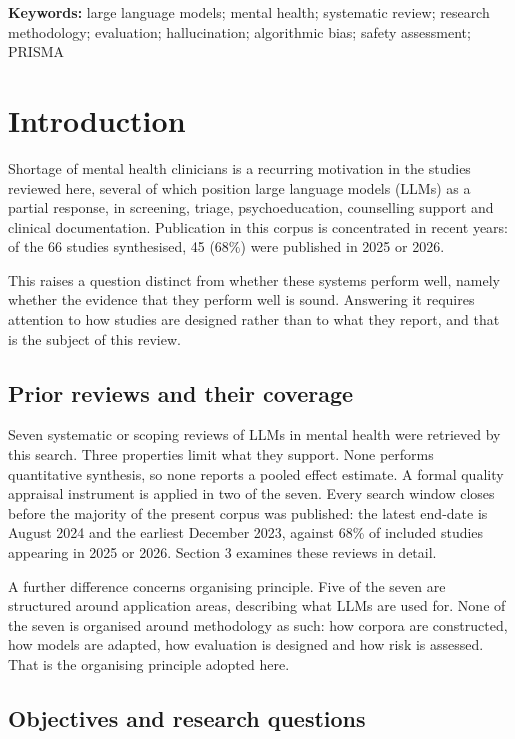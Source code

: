 \documentclass[11pt]{article}
\begin{document}
	\noindent\textbf{Keywords:} large language models; mental health; systematic review; research
	methodology; evaluation; hallucination; algorithmic bias; safety assessment; PRISMA
	
	\section{Introduction}
	
	Shortage of mental health clinicians is a recurring motivation in the studies reviewed here, several
	of which position large language models (LLMs) as a partial response, in screening, triage,
	psychoeducation, counselling support and clinical documentation. Publication in this corpus is
	concentrated in recent years: of the 66 studies synthesised, 45 (68\%) were published in 2025 or
	2026.
	
	This raises a question distinct from whether these systems perform well, namely
	whether the evidence that they perform well is sound. Answering it requires attention to how studies
	are designed rather than to what they report, and that is the subject of this review.
	
	\subsection{Prior reviews and their coverage}
	
	Seven systematic or scoping reviews of LLMs in mental health were retrieved by this
	search\cite{Jin2025LLMMentalHealth,Hua2025LLMMentalHealthScoping,fpsyg.2025.1715306,Hua2025,WANG2025,Kolding2025,GUO2024}.
	Three properties limit what they support. None performs quantitative synthesis, so none reports a
	pooled effect estimate. A formal quality appraisal instrument is applied in two of the seven. Every search window closes before the
	majority of the present corpus was published: the latest end-date is August 2024 and the earliest
	December 2023, against 68\% of included studies appearing in 2025 or 2026. Section 3 examines these
	reviews in detail.
	
	A further difference concerns organising principle. Five of the seven are structured around
	application areas, describing what LLMs are used for. None of the seven is organised around
	methodology as such: how corpora are constructed, how models are adapted, how evaluation is designed and how risk
	is assessed. That is the organising principle adopted here.
	
	\subsection{Objectives and research questions}
	
\end{document}
